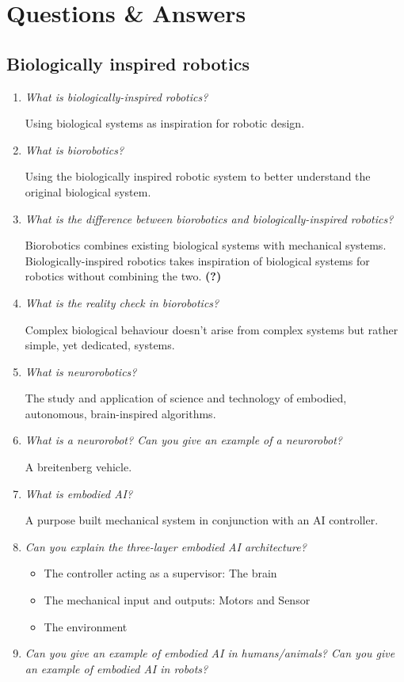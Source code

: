 \documentclass[
    fontsize      = 11pt,
    paper         = a4,
    twoside       = false,
    parskip       = half,
    pagesize      = false,
]{scrartcl}
\author{Robin Prillwitz}
\date{13. August 2022}
\providecommand{\tightlist}{%
  \setlength{\itemsep}{0pt}\setlength{\parskip}{0pt}}
\begin{document}
\hypertarget{questions-answers}{%
\section{Questions \& Answers}\label{questions-answers}}

\hypertarget{biologically-inspired-robotics}{%
\subsection{Biologically inspired
robotics}\label{biologically-inspired-robotics}}

\begin{enumerate}
\def\labelenumi{\arabic{enumi}.}
\item
  \emph{What is biologically-inspired robotics?}

  Using biological systems as inspiration for robotic design.
\item
  \emph{What is biorobotics?}

  Using the biologically inspired robotic system to better understand
  the original biological system.
\item
  \emph{What is the difference between biorobotics and
  biologically-inspired robotics?}

  Biorobotics combines existing biological systems with mechanical
  systems. Biologically-inspired robotics takes inspiration of
  biological systems for robotics without combining the two.
  \textbf{(?)}
\item
  \emph{What is the reality check in biorobotics?}

  Complex biological behaviour doesn't arise from complex systems but
  rather simple, yet dedicated, systems.
\item
  \emph{What is neurorobotics?}

  The study and application of science and technology of embodied,
  autonomous, brain-inspired algorithms.
\item
  \emph{What is a neurorobot? Can you give an example of a neurorobot?}

  A breitenberg vehicle.
\item
  \emph{What is embodied AI?}

  A purpose built mechanical system in conjunction with an AI
  controller.
\item
  \emph{Can you explain the three-layer embodied AI architecture?}

  \begin{itemize}
  \tightlist
  \item
    The controller acting as a supervisor: The brain
  \item
    The mechanical input and outputs: Motors and Sensor
  \item
    The environment
  \end{itemize}
\item
  \emph{Can you give an example of embodied AI in humans/animals? Can
  you give an example of embodied AI in robots?}


\end{enumerate}
\end{document}

